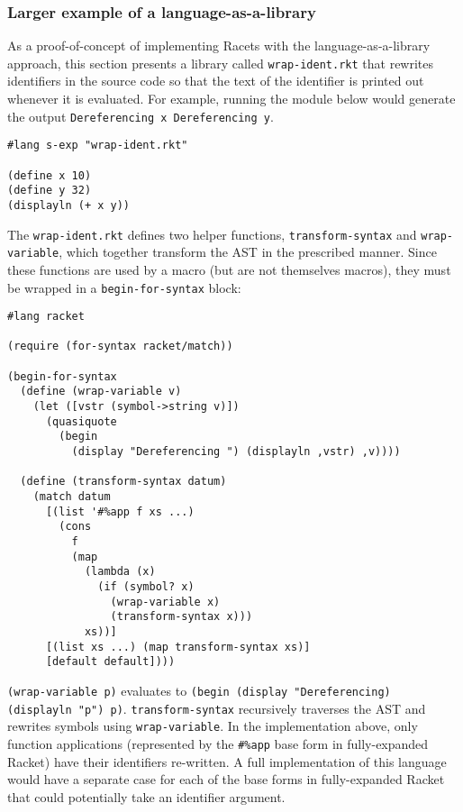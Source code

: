 \documentclass{article}
\begin{document}
\subsubsection{Larger example of a language-as-a-library}
As a proof-of-concept of implementing Racets with the language-as-a-library approach, this section presents a library called \texttt{wrap-ident.rkt} that rewrites identifiers in the source code so that the text of the identifier is printed out whenever it is evaluated. For example, running the module below would generate the output \texttt{Dereferencing x  Dereferencing y}.

\begin{lstlisting}
#lang s-exp "wrap-ident.rkt"

(define x 10)
(define y 32)
(displayln (+ x y))
\end{lstlisting}

The \texttt{wrap-ident.rkt} defines two helper functions, \texttt{transform-syntax} and \texttt{wrap-variable}, which together transform the AST in the prescribed manner. Since these functions are used by a macro (but are not themselves macros), they must be wrapped in a \texttt{begin-for-syntax} block:

\begin{lstlisting}
#lang racket

(require (for-syntax racket/match))

(begin-for-syntax
  (define (wrap-variable v)
    (let ([vstr (symbol->string v)])
      (quasiquote
        (begin
          (display "Dereferencing ") (displayln ,vstr) ,v))))

  (define (transform-syntax datum)
    (match datum
      [(list '#%app f xs ...)
        (cons
          f
          (map
            (lambda (x)
              (if (symbol? x)
                (wrap-variable x)
                (transform-syntax x)))
            xs))]
      [(list xs ...) (map transform-syntax xs)]
      [default default])))
\end{lstlisting}

\texttt{(wrap-variable p)} evaluates to \texttt{(begin (display "Dereferencing) (displayln "p") p)}. \texttt{transform-syntax} recursively traverses the AST and rewrites symbols using \texttt{wrap-variable}. In the implementation above, only function applications (represented by the \texttt{\#\%app} base form in fully-expanded Racket) have their identifiers re-written. A full implementation of this language would have a separate case for each of the base forms in fully-expanded Racket that could potentially take an identifier argument.
\end{document}
